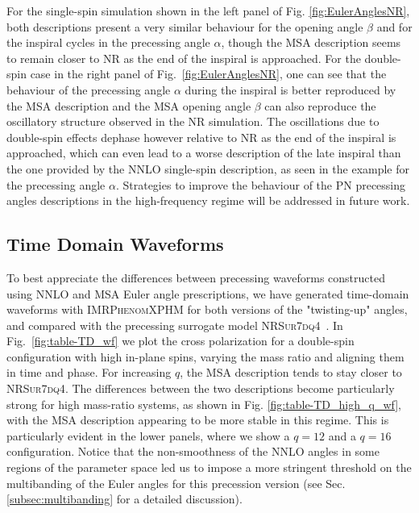 \documentclass[%
aps,
prd,
amssymb,
amsmath,
amsfonts,
eqsecnum,
showpacs,
nofootinbib,
floatfix,
twocolumn,
twoside,
a4paper,
superscriptaddress
]{revtex4-1}
\newcommand{\phXPHM}{\textsc{IMRPhenomXPHM}\xspace}
\newcommand{\NRSur}{\textsc{NRSur7dq4}\xspace}
\begin{document}
For the single-spin simulation shown in the left panel of Fig. \ref{fig:EulerAnglesNR}, both descriptions present a very similar behaviour for the opening angle $\beta$ and for the inspiral cycles in the precessing angle $\alpha$, though the MSA description seems to remain closer to NR as the end of the inspiral is approached. For the double-spin case in the right panel of Fig.~\ref{fig:EulerAnglesNR}, one can see that the behaviour of the precessing angle $\alpha$ during the inspiral is better reproduced by the MSA description and the MSA opening angle $\beta$ can also reproduce the oscillatory structure observed in the NR simulation. The oscillations due to double-spin effects dephase however relative to NR as the end of the inspiral is approached, which can even lead to a worse description of the late inspiral than the one provided by the NNLO single-spin description, as seen in the example for the precessing angle $\alpha$. Strategies to improve the behaviour of the PN precessing angles descriptions in the high-frequency regime will be addressed in future work.



\subsection{Time Domain Waveforms}\label{sec:TD_waveforms}

To best appreciate the differences between precessing waveforms constructed using NNLO and MSA Euler angle prescriptions, we have generated time-domain waveforms with \phXPHM for both versions of the "twisting-up" angles, and compared with the precessing surrogate model \NRSur~\cite{Varma:2019csw}. In Fig.~\ref{fig:table-TD_wf} we plot the cross polarization for a double-spin configuration with high in-plane spins, varying the mass ratio and aligning them in time and phase.
For increasing $q$, the MSA description tends to stay closer to \NRSur. The differences between the two descriptions become particularly strong for high mass-ratio systems, as shown in Fig. \ref{fig:table-TD_high_q_wf}, with the MSA description appearing to be more stable in this regime. This is particularly evident in the lower panels, where we show a $q=12$ and a $q=16$ configuration. Notice that the non-smoothness of the NNLO angles in some regions of the parameter space led us to impose a more stringent threshold on the multibanding of the Euler angles for this precession version (see Sec.\ref{subsec:multibanding} for a detailed discussion).
\end{document}
